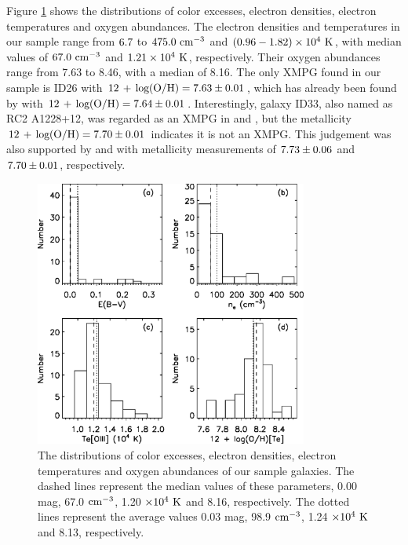 \documentclass[usenatbib]{raa}
\begin{document}
Figure \ref{plot_hist} shows the distributions of color excesses, electron 
densities,
electron temperatures and oxygen abundances.  The electron densities and 
temperatures
in our sample range from $\rm 6.7$ to $\rm 475.0 \ cm^{-3}$ 
and $\rm (0.96\--1.82)\times 10^4 \ K$, with median values of $\rm 67.0 \ 
cm^{-3}$ and
$\rm 1.21\times 10^4 \ K$, respectively.  Their oxygen abundances range from 
7.63 to 8.46, with a median of 8.16. The only  XMPG found in our sample is 
ID26 with
$\rm \hbox{$12\, +\, {\rm log(O/H)}$}=7.63\pm0.01$, which has already been  found by 
\cite{2012AA...546A.122I} with 
$\rm \hbox{$12\, +\, {\rm log(O/H)}$}=7.64\pm0.01$. Interestingly, galaxy ID33, also named as RC2 
A1228+12, was 
regarded as an XMPG in \cite{2000AARv..10....1K} and \cite{2014MNRAS.441.2346B}, 
but the metallicity 
$\rm \hbox{$12\, +\, {\rm log(O/H)}$}=7.70\pm0.01$ indicates it is not an XMPG. This judgement was
also supported by \cite{2002AA...389..779P} and \cite{2012MNRAS.427.1229I} with 
metallicity
measurements of $\rm 7.73\pm0.06$ and $\rm 7.70\pm0.01$, respectively. 

 \begin{figure}[h]
\center
\includegraphics[width=0.8\textwidth]{fig4.eps}
\caption{The distributions of color excesses, electron densities, electron 
temperatures
and oxygen abundances of our sample galaxies. The dashed lines represent the 
median values of these 
parameters, 0.00 mag, 67.0 $\rm cm^{-3}$, 1.20 $\rm \times 10^4 \ K$ and 8.16, 
respectively. The dotted 
lines represent the average values 0.03 mag, 98.9 $\rm cm^{-3}$, 1.24
$\rm \times 10^4 \ K$ and 8.13, respectively.}
\label{plot_hist}
\end{figure}
 
\end{document}
